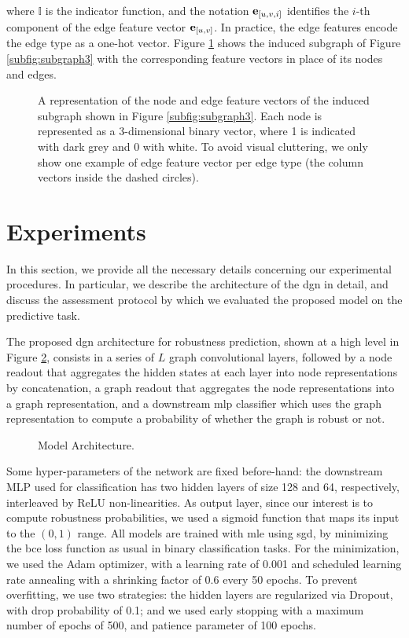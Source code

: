 where $\mathbb{I}$ is the indicator function, and the notation $\Elem{e}{u, v, i}$ identifies the $i$-th component of the edge feature vector $\Elem{e}{u, v}$. In practice, the edge features encode the edge type as a one-hot vector. Figure \ref{fig:pathway-graph-features} shows the induced subgraph of Figure \ref{subfig:subgraph3} with the corresponding feature vectors in place of its nodes and edges.
\begin{figure}[h!]
    \centering
    \resizebox{.8\textwidth}{!}{}
    \caption{A representation of the node and edge feature vectors of the induced subgraph shown in Figure \ref{subfig:subgraph3}. Each node is represented as a 3-dimensional binary vector, where 1 is indicated with dark grey and 0 with white. To avoid visual cluttering, we only show one example of edge feature vector per edge type (the column vectors inside the dashed circles).}
    \label{fig:pathway-graph-features}
\end{figure}

\section{Experiments}\label{sec:pathway-experiments}
In this section, we provide all the necessary details concerning our experimental procedures. In particular, we describe the architecture of the \gls{dgn} in detail, and discuss the assessment protocol by which we evaluated the proposed model on the predictive task.

The proposed \gls{dgn} architecture for robustness prediction, shown at a high level in Figure \ref{fig:architecture}, consists in a series of $L$ graph convolutional layers, followed by a node readout that aggregates the hidden states at each layer into node representations by concatenation, a graph readout that aggregates the node representations into a graph representation, and a downstream \gls{mlp} classifier which uses the graph representation to compute a probability of whether the graph is robust or not.
\begin{figure}[h!]
    \centering
    \resizebox{.95\textwidth}{!}{}
    \caption{Model Architecture.}
    \label{fig:architecture}
\end{figure}
Some hyper-parameters of the network are fixed before-hand: the downstream MLP used for classification has two hidden layers of size 128 and 64, respectively, interleaved by ReLU non-linearities. As output layer, since our interest is to compute robustness probabilities, we used a sigmoid function that maps its input to the $(0, 1)$ range. All models are trained with \gls{mle} using \gls{sgd}, by minimizing the \gls{bce} loss function as usual in binary classification tasks. For the minimization, we used the Adam optimizer, with a learning rate of 0.001 and scheduled learning rate annealing with a shrinking factor of 0.6 every 50 epochs. To prevent overfitting, we use two strategies: the hidden layers are regularized via Dropout, with drop probability of 0.1; and we used early stopping with a maximum number of epochs of 500, and patience parameter of 100 epochs.

